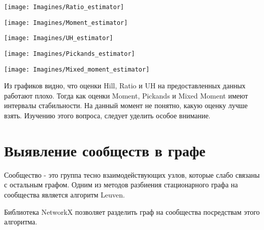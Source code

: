 \documentclass[a4paper,12pt]{article}
\begin{document}
\begin{center}
\centering 
\texttt{[image: Imagines/Ratio\_estimator]}
\end{center}

\begin{center}
\centering 
\texttt{[image: Imagines/Moment\_estimator]}
\end{center}

\begin{center}
\centering 
\texttt{[image: Imagines/UH\_estimator]}
\end{center}

\begin{center}
\centering 
\texttt{[image: Imagines/Pickands\_estimator]}
\end{center}

\begin{center}
\centering 
\texttt{[image: Imagines/Mixed\_moment\_estimator]}
\end{center}

Из графиков видно, что оценки Hill, Ratio и UH на предоставленных данных работают плохо. Тогда как оценки Moment, Pickands и Mixed Moment имеют интервалы стабильности. На данный момент не понятно, какую оценку лучше взять. Изучению этого вопроса, следует уделить особое внимание.



	
	
	
	
	


\section{Выявление сообществ в графе}
Сообщество - это группа тесно взаимодействующих узлов, которые слабо связаны с остальным графом.
Одним из методов разбиения стационарного графа на сообщества является алгоритм Leuven. \cite{book8}

Библиотека NetworkX позволяет разделить граф на сообщества посредствам этого алгоритма. 
\end{document}
